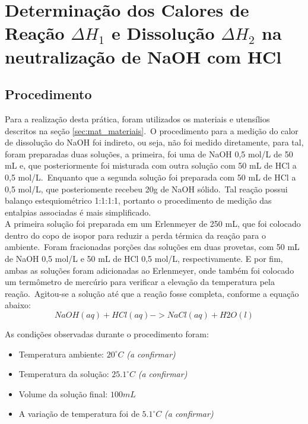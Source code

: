 \section[Parte Experimental]{Determinação dos Calores de Reação  $\Delta{H_{1}}$ e Dissolução $\Delta{H_{2}}$ na neutralização de NaOH com HCl}\label{sec:parte_experimental}
    \subsection{Procedimento}\label{sec:procedimento}

        \indent Para a realização desta prática, foram utilizados os materiais e utensílios descritos na seção \ref{sec:mat_materiais}.\ O procedimento para a medição do calor de dissolução do NaOH foi indireto, ou seja, não foi medido diretamente, para tal, foram preparadas duas soluções, a primeira, foi uma de NaOH 0,5 mol/L de 50 mL e, que posteriormente foi misturada com outra solução com 50 mL de HCl a 0,5 mol/L.\ Enquanto que a segunda solução foi preparada com 50 mL de HCl a 0,5 mol/L, que posteriomente recebeu 20g de NaOH sólido.\ Tal reação possui balanço estequiométrico 1:1:1:1, portanto o procedimento de medição das entalpias associadas é mais simplificado.\\
        
        \indent A primeira solução foi preparada em um Erlenmeyer de 250 mL, que foi colocado dentro do copo de isopor para reduzir a perda térmica da reação para o ambiente.\ Foram fracionadas porções das soluções em duas provetas, com 50 mL de NaOH 0,5 mol/L e 50 mL de HCl 0,5 mol/L, respectivamente. E por fim, ambas as soluções foram adicionadas ao Erlenmeyer, onde também foi colocado um termômetro de mercúrio para verificar a elevação da temperatura pela reação.\ Agitou-se a solução até que a reação fosse completa, conforme a equação abaixo:
        \begin{equation}
            {NaOH(aq) + HCl(aq) -> NaCl(aq) + H2O(l)}
            \label{eq:equation_principal1}
        \end{equation}
    
    	\indent As condições observadas durante o procedimento foram:
    	\begin{itemize}
    		\item Temperatura ambiente: $20^{\circ}C$ \textit{(a confirmar)}
    		\item Temperatura da solução: $25.1^{\circ}C$ \textit{(a confirmar)}
            \item Volume da solução final: $100 mL$
            \item A variação de temperatura foi de ${5.1}^{\circ}C$ \textit{(a confirmar)}
    	\end{itemize}

